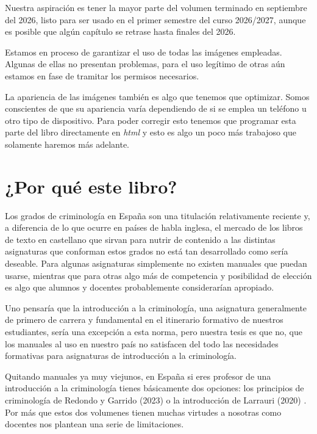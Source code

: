 \documentclass[
  spanish,
  letterpaper,
  DIV=11,
  numbers=noendperiod]{scrreprt}
\begin{document}
Nuestra aspiración es tener la mayor parte del volumen terminado en
septiembre del 2026, listo para ser usado en el primer semestre del
curso 2026/2027, aunque es posible que algún capítulo se retrase hasta
finales del 2026.

Estamos en proceso de garantizar el uso de todas las imágenes empleadas.
Algunas de ellas no presentan problemas, para el uso legítimo de otras
aún estamos en fase de tramitar los permisos necesarios.

La apariencia de las imágenes también es algo que tenemos que optimizar.
Somos conscientes de que su apariencia varía dependiendo de si se emplea
un teléfono u otro tipo de dispositivo. Para poder corregir esto tenemos
que programar esta parte del libro directamente en \emph{html} y esto es
algo un poco más trabajoso que solamente haremos más adelante.

\section*{¿Por qué este libro?}\label{por-quuxe9-este-libro}


Los grados de criminología en España son una titulación relativamente
reciente y, a diferencia de lo que ocurre en países de habla inglesa, el
mercado de los libros de texto en castellano que sirvan para nutrir de
contenido a las distintas asignaturas que conforman estos grados no está
tan desarrollado como sería deseable. Para algunas asignaturas
simplemente no existen manuales que puedan usarse, mientras que para
otras algo más de competencia y posibilidad de elección es algo que
alumnos y docentes probablemente considerarían apropiado.

Uno pensaría que la introducción a la criminología, una asignatura
generalmente de primero de carrera y fundamental en el itinerario
formativo de nuestros estudiantes, sería una excepción a esta norma,
pero nuestra tesis es que no, que los manuales al uso en nuestro país no
satisfacen del todo las necesidades formativas para asignaturas de
introducción a la criminología.

Quitando manuales ya muy viejunos, en España si eres profesor de una
introducción a la criminología tienes básicamente dos opciones: los
principios de criminología de Redondo y Garrido (2023) o la introducción
de Larrauri (2020) . Por más que estos dos volumenes tienen muchas
virtudes a nosotras como docentes nos plantean una serie de
limitaciones.
\end{document}
